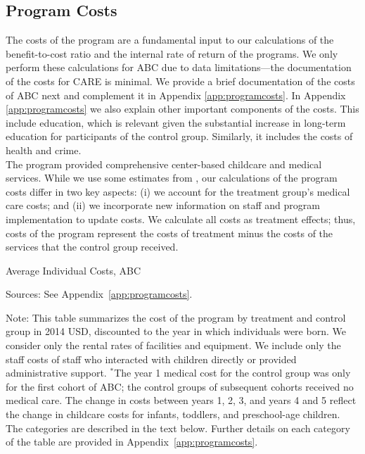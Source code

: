 \subsection{Program Costs}

\noindent The costs of the program are a fundamental input to our calculations of the benefit-to-cost ratio and the internal rate of return of the programs. We only perform these calculations for ABC due to data limitations---the documentation of the costs for  CARE is minimal. We provide a brief documentation of the costs of ABC next and complement it in Appendix \ref{app:programcosts}. In Appendix \ref{app:programcosts} we also explain other important components of the costs. This include education, which is relevant given the substantial increase in long-term education for participants of the control group. Similarly, it includes the costs of health and crime.\\


\noindent The program provided comprehensive center-based childcare and medical services. While we use some estimates from \cite{Masse_Barnett_2002_BOOKBenefitCostAnalysis}, our calculations of the program costs differ in two key aspects: (i) we account for the treatment group's medical care costs; and (ii) we incorporate new information on staff and program implementation to update costs. We calculate all costs as treatment effects; thus, costs of the program represent the costs of treatment minus the costs of the services that the control group received.\\

\begin{table}[H]
\begin{threeparttable}
\caption{Average Individual Costs, ABC} \label{tab:totalcosts}
\footnotesize

\begin{tablenotes}
\footnotesize
\item Sources: See Appendix~\ref{app:programcosts}.\\
\item Note: This table summarizes the cost of the program by treatment and control group in 2014 USD, discounted to the year in which individuals were born. We consider only the rental rates of facilities and equipment. We include only the staff costs of staff who interacted with children directly or provided administrative support. $^{*}$The year 1 medical cost for the control group was only for the first cohort of ABC; the control groups of subsequent cohorts received no medical care. The change in costs between years 1, 2, 3, and years 4 and 5 reflect the change in childcare costs for infants, toddlers, and preschool-age children. The categories are described in the text below. Further details on each category of the table are provided in Appendix~\ref{app:programcosts}.
\end{tablenotes}
\end{threeparttable}
\end{table}


